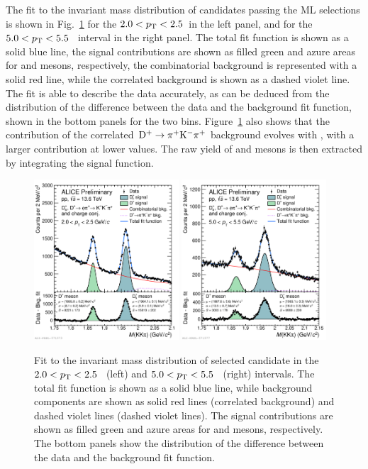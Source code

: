 The fit to the invariant mass distribution of candidates passing the ML selections is shown in Fig.~\ref{fig:new_fit} for the $2.0<p_\mathrm{T}<2.5$~\gevc in the left panel, and for the {$5.0<p_\mathrm{T}<5.5$~\gevc} interval in the right panel. The total fit function is shown as a solid blue line, the signal contributions are shown as filled green and azure areas for \dpl and \ds mesons, respectively, the combinatorial background is represented with a solid red line, while the correlated background is shown as a dashed violet line. The fit is able to describe the data accurately, as can be deduced from the distribution of the difference between the data and the background fit function, shown in the bottom panels for the two \pt bins. Figure~\ref{fig:new_fit} also shows that the contribution of the correlated $\mathrm{D^+}\rightarrow\mathrm{\pi^+K^-\pi^+}$ background evolves with \pt, with a larger contribution at lower \pt values. The raw yield of \ds and \dpl mesons is then extracted by integrating the signal function.

\begin{figure}[htb]
    \centering
    \includegraphics[width=0.48\textwidth]{Figures/Chapter 5/invmassfit_2_2p5.pdf}
    \includegraphics[width=0.48\textwidth]{Figures/Chapter 5/invmassfit_5_5p5.pdf}
    \caption{Fit to the invariant mass distribution of selected candidate in the \mbox{$2.0<p_\mathrm{T}<2.5$~\gevc} (left) and \mbox{$5.0<p_\mathrm{T}<5.5$~\gevc} (right) intervals. The total fit function is shown as a solid blue line, while background components are shown as solid red lines (correlated background) and dashed violet lines (dashed violet lines). The signal contributions are shown as filled green and azure areas for \dpl and \ds mesons, respectively. The bottom panels show the distribution of the difference between the data and the background fit function.}
    \label{fig:new_fit}
\end{figure}

